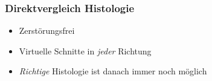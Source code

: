 
\begin{frame}
	\frametitle{Direktvergleich Histologie \leftrightarrow \uct}
	\begin{itemize}
		\item Zerstörungsfrei
		\item Virtuelle Schnitte in \emph{jeder} Richtung
		\item \emph{Richtige} Histologie ist danach immer noch möglich
	\end{itemize}
\end{frame}

